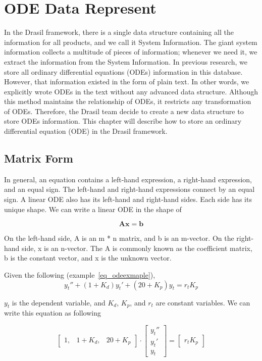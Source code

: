 \chapter{ODE Data Represent}
In the Drasil framework, there is a single data structure containing all the information for all products, and we call it System Information. The giant system information collects a multitude of pieces of information; whenever we need it, we extract the information from the System Information. In previous research, we store all ordinary differential equations (ODEs) information in this database. However, that information existed in the form of plain text. In other words, we explicitly wrote ODEs in the text without any advanced data structure. Although this method maintains the relationship of ODEs, it restricts any transformation of ODEs. Therefore, the Drasil team decide to create a new data structure to store ODEs information. This chapter will describe how to store an ordinary differential equation (ODE) in the Drasil framework. 

\section{Matrix Form}
In general, an equation contains a left-hand expression, a right-hand expression, and an equal sign. The left-hand and right-hand expressions connect by an equal sign. A linear ODE also has its left-hand and right-hand sides. Each side has its unique shape. We can write a linear ODE in the shape of

\begin{equation} \label{eq_matrixform}
	\boldsymbol{Ax} = \boldsymbol{b}
\end{equation}

On the left-hand side, A is an m * n matrix, and b is an m-vector. On the right-hand side, x is an n-vector. The A is commonly known as the coefficient matrix, b is the constant vector, and x is the unknown vector.

Given the following (example~\ref{eq_odeexmaple}),
\begin{equation} \label{eq_odeexmaple}
	y_t'' + (1 + K_d)y_t' + (20 + K_p)y_t = r_t K_p
\end{equation}

$y_t$ is the dependent variable, and $K_d$, $K_p$, and $r_t$ are constant variables. We can write this equation as following 

\begin{equation} \label{eq_matrixformexmaple}
	\begin{bmatrix}
		1, & 1 + K_{d}, & 20 + K_{p}
	\end{bmatrix}
	\cdot
	\begin{bmatrix}
		y_{t}''  \\
		y_{t}'   \\
		y_{t}  
	\end{bmatrix}
	=
	\begin{bmatrix}
		r_{t} K_{p} 
	\end{bmatrix}
\end{equation}

